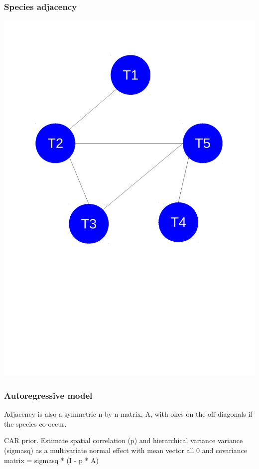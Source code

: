 \documentclass{beamer}
\begin{document}
\begin{frame}
  \frametitle{Species adjacency}
  \begin{center}
    \includegraphics[height = 0.8\textheight, width = \textwidth,  keepaspectratio = true]{figure/one_mode}
  \end{center}
\end{frame}

\begin{frame}
  \frametitle{Autoregressive model}

  Adjacency is also a symmetric n by n matrix, A, with ones on the off-diagonals if the species co-occur.

  CAR prior. Estimate spatial correlation (p) and hierarchical variance variance (sigmasq) as a multivariate normal effect with mean vector all 0 and covariance matrix = sigmasq * (I - p * A)
\end{frame}
\end{document}
